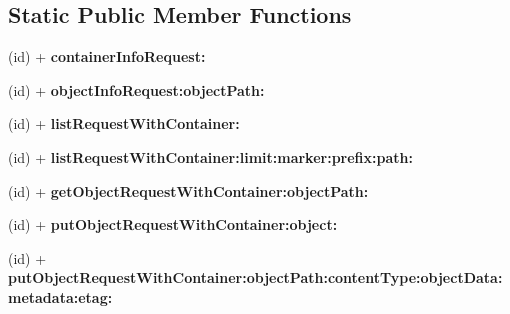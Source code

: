 \subsection*{\-Static \-Public \-Member \-Functions}
\begin{DoxyCompactItemize}
\item 
\hypertarget{interface_a_s_i_cloud_files_object_request_ab9af59ae6c15be52c702e45fca805db9}{
(id) + {\bfseries container\-Info\-Request\-:}}
\label{interface_a_s_i_cloud_files_object_request_ab9af59ae6c15be52c702e45fca805db9}

\item 
\hypertarget{interface_a_s_i_cloud_files_object_request_a4b4f0ea695cdec431818f4ca24a8a1cf}{
(id) + {\bfseries object\-Info\-Request\-:object\-Path\-:}}
\label{interface_a_s_i_cloud_files_object_request_a4b4f0ea695cdec431818f4ca24a8a1cf}

\item 
\hypertarget{interface_a_s_i_cloud_files_object_request_ad140f7f65fef97218ff5a8853afbc0c7}{
(id) + {\bfseries list\-Request\-With\-Container\-:}}
\label{interface_a_s_i_cloud_files_object_request_ad140f7f65fef97218ff5a8853afbc0c7}

\item 
\hypertarget{interface_a_s_i_cloud_files_object_request_a67e5f2848052dcdf80aac2ffd4f64525}{
(id) + {\bfseries list\-Request\-With\-Container\-:limit\-:marker\-:prefix\-:path\-:}}
\label{interface_a_s_i_cloud_files_object_request_a67e5f2848052dcdf80aac2ffd4f64525}

\item 
\hypertarget{interface_a_s_i_cloud_files_object_request_ac41ac1686f40dd0b25f473b95de56a2b}{
(id) + {\bfseries get\-Object\-Request\-With\-Container\-:object\-Path\-:}}
\label{interface_a_s_i_cloud_files_object_request_ac41ac1686f40dd0b25f473b95de56a2b}

\item 
\hypertarget{interface_a_s_i_cloud_files_object_request_ac9c57b5595d42ea6fdb13b9baa5ad073}{
(id) + {\bfseries put\-Object\-Request\-With\-Container\-:object\-:}}
\label{interface_a_s_i_cloud_files_object_request_ac9c57b5595d42ea6fdb13b9baa5ad073}

\item 
\hypertarget{interface_a_s_i_cloud_files_object_request_a51fd51b32cb64756aa6fbc3f50ff7df4}{
(id) + {\bfseries put\-Object\-Request\-With\-Container\-:object\-Path\-:content\-Type\-:object\-Data\-:metadata\-:etag\-:}}
\label{interface_a_s_i_cloud_files_object_request_a51fd51b32cb64756aa6fbc3f50ff7df4}


\end{DoxyCompactItemize}
